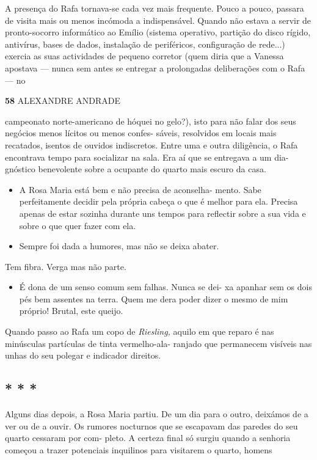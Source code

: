 A presença do Rafa tornava-se cada vez mais frequente. Pouco a pouco,
passara de visita mais ou menos incómoda a indispensável. Quando não
estava a servir de pronto-socorro informático ao Emílio (sistema
operativo, partição do disco rígido, antivírus, bases de dados,
instalação de periféricos, configuração de rede...) exercia as suas
actividades de pequeno corretor (quem diria que a Vanessa apostava ---
nunca sem antes se entregar a prolongadas deliberações com o Rafa --- no

\textbf{58 }ALEXANDRE ANDRADE

campeonato norte-americano de hóquei no gelo?), isto para não falar dos
seus negócios menos lícitos ou menos confes- sáveis, resolvidos em
locais mais recatados, isentos de ouvidos indiscretos. Entre uma e outra
diligência, o Rafa encontrava tempo para socializar na sala. Era aí que
se entregava a um dia- gnóstico benevolente sobre a ocupante do quarto
mais escuro da casa.

\begin{itemize}
\tightlist
\item
  A Rosa Maria está bem e não precisa de aconselha- mento. Sabe
  perfeitamente decidir pela própria cabeça o que é melhor para ela.
  Precisa apenas de estar sozinha durante uns tempos para reflectir
  sobre a sua vida e sobre o que quer fazer com ela.
\item
  Sempre foi dada a humores, mas não se deixa abater.
\end{itemize}

Tem fibra. Verga mas não parte.

\begin{itemize}
\tightlist
\item
  É dona de um senso comum sem falhas. Nunca se dei- xa apanhar sem os
  dois pés bem assentes na terra. Quem me dera poder dizer o mesmo de
  mim próprio! Brutal, este queijo.
\end{itemize}

Quando passo ao Rafa um copo de \emph{Riesling, }aquilo em que reparo é
nas minúsculas partículas de tinta vermelho-ala- ranjado que permanecem
visíveis nas unhas do seu polegar e indicador direitos.


\subsection{* * *}

Alguns dias depois, a Rosa Maria partiu. De um dia para o outro,
deixámos de a ver ou de a ouvir. Os rumores nocturnos que se escapavam
das paredes do seu quarto cessaram por com- pleto. A certeza final só
surgiu quando a senhoria começou a trazer potenciais inquilinos para
visitarem o quarto, homens

